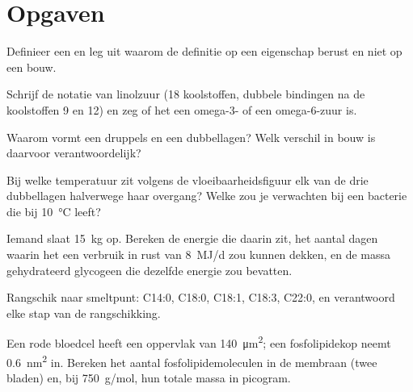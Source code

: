 \section{Opgaven}

\begin{exercise}[$\star$]\label{exo:b1:lipids:1}
Definieer een  en leg uit waarom de definitie op een eigenschap berust en
niet op een bouw.
\end{exercise}

\begin{exercise}[$\star$]\label{exo:b1:lipids:2}
Schrijf de notatie van linolzuur (18 koolstoffen, dubbele bindingen na de
koolstoffen 9 en 12) en zeg of het een omega-3- of een omega-6-zuur is.
\end{exercise}

\begin{exercise}[$\star$]\label{exo:b1:lipids:3}
Waarom vormt een  druppels en een  dubbellagen? Welk
verschil in bouw is daarvoor verantwoordelijk?
\end{exercise}

\begin{exercise}[$\star$]\label{exo:b1:lipids:4}
Bij welke temperatuur zit volgens de vloeibaarheidsfiguur elk van de drie
dubbellagen halverwege haar overgang? Welke zou je verwachten bij een bacterie die
bij \qty{10}{\celsius} leeft?
\end{exercise}

\begin{exercise}[$\star\star$]\label{exo:b1:lipids:5}
Iemand slaat \qty{15}{kg}  op. Bereken de energie die daarin zit, het aantal
dagen waarin het een verbruik in rust van \qty{8}{MJ/d} zou kunnen dekken, en de
massa gehydrateerd glycogeen die dezelfde energie zou bevatten.
\end{exercise}

\begin{exercise}[$\star\star$]\label{exo:b1:lipids:6}
Rangschik naar smeltpunt: C14:0, C18:0, C18:1, C18:3, C22:0, en verantwoord elke
stap van de rangschikking.
\end{exercise}

\begin{exercise}[$\star\star$]\label{exo:b1:lipids:7}
Een rode bloedcel heeft een oppervlak van \qty{140}{\micro m^2}; een fosfolipidekop
neemt \qty{0.6}{nm^2} in. Bereken het aantal fosfolipidemoleculen in de membraan
(twee bladen) en, bij \qty{750}{g/mol}, hun totale massa in picogram.
\end{exercise}

